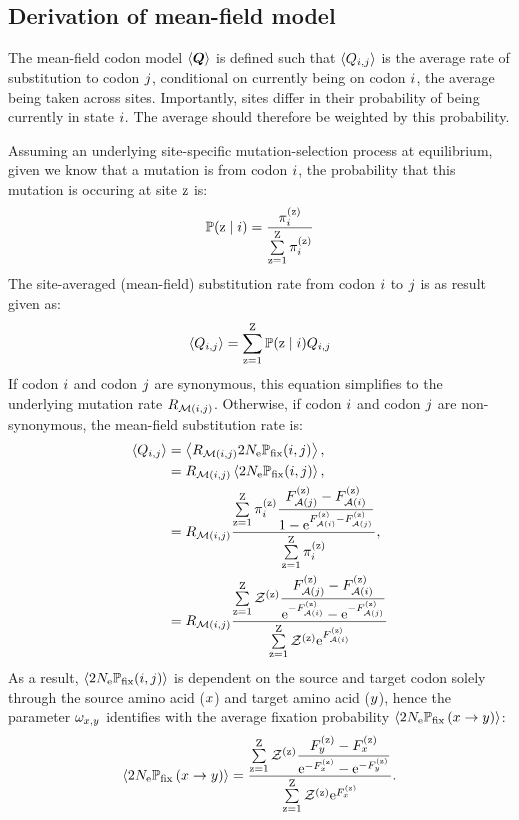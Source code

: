 \documentclass{article}
\begin{document}
\subsection{Derivation of mean-field model}
\label{subsec:mean-field-derivation}
The mean-field codon model $\left\langle \bm{Q} \right\rangle$ is defined such that $\left\langle Q_{{i}, {j}} \right\rangle$ is the average rate of {substitution} to codon ${j}$, conditional on currently being on codon ${i}$, the average being taken across sites.
Importantly, sites differ in their probability of being currently in state ${i}$.
The average should therefore be weighted by this probability.

Assuming an underlying site-specific mutation-selection process at equilibrium, given we know that a mutation is from codon ${i}$, the probability that this mutation is occuring at site $\text{z}$ is:
\begin{align}
 \mathbb{P} (\text{z} \mid {i}) = \dfrac{ \pi_{{i}}^{(\text{z})} }{\sum\limits_{\text{z}=1}^{\text{Z}} \pi_{{i}}^{(\text{z})} }
\end{align}
The site-averaged (mean-field) {substitution} rate from codon ${i}$ to ${j}$ is as result given as:
\begin{align}
 \left\langle Q_{{i}, {j}} \right\rangle = \sum\limits_{\text{z}=1}^{\text{Z}} \mathbb{P} (\text{z} \mid {i}) Q_{{i}, {j}}
\end{align}
If codon ${i}$ and codon ${j}$ are {synonymous}, this equation simplifies to the underlying mutation rate $R_{\mathcal{M}({i}, {j})}$.
Otherwise, if codon ${i}$ and codon ${j}$ are {non-synonymous}, the mean-field {substitution} rate is:
\begin{align}
 \left\langle Q_{{i}, {j}} \right\rangle & = \left\langle R_{\mathcal{M}({i}, {j})} 2 N_{\text{e}} \mathbb{P}_{\text{fix}} ({i}, {j}) \right\rangle, \\
 & = R_{\mathcal{M}({i}, {j})} \left\langle 2 N_{\text{e}} \mathbb{P}_{\text{fix}} ({i}, {j}) \right\rangle, \\
 & = R_{\mathcal{M}({i}, {j})} \dfrac{ \sum\limits_{\text{z}=1}^{\text{Z}} \pi_{{i}}^{(\text{z})} \dfrac{F_{\mathcal{A}({j})}^{(\text{z})} - F_{\mathcal{A}({i})}^{(\text{z})}}{1 - \text{e}^{F_{\mathcal{A}({i})}^{(\text{z})} - F_{\mathcal{A}({j})}^{(\text{z})}}} }{ \sum\limits_{\text{z}=1}^{\text{Z}} \pi_{{i}}^{(\text{z})} }, \\
 & = R_{\mathcal{M}({i}, {j})} \dfrac{ \sum\limits_{\text{z}=1}^{\text{Z}} \mathcal{Z}^{(\text{z})} \dfrac{F_{\mathcal{A}({j})}^{(\text{z})} - F_{\mathcal{A}({i})}^{(\text{z})}}{ \text{e}^{-F_{\mathcal{A}({i})}^{(\text{z})}} - \text{e}^{ - F_{\mathcal{A}({j})}^{(\text{z})}}} }{ \sum\limits_{\text{z}=1}^{\text{Z}} \mathcal{Z}^{(\text{z})} \text{e}^{F_{\mathcal{A}({i})}^{(\text{z})}} }
\end{align}
As a result, $\left\langle 2 N_{\text{e}} \mathbb{P}_{\text{fix}} ({i}, {j}) \right\rangle$ is dependent on the source and target codon solely through the source amino acid ($x$) and target amino acid ($y$), hence the parameter $\omega_{x, y}$ identifies with the average fixation probability $\left\langle 2 N_{\text{e}} \mathbb{P}_{\text{fix}} \left( x \to y \right) \right\rangle$:
\begin{equation}
 \label{eq:omega_pairs_predicted} \left\langle 2 N_{\text{e}} \mathbb{P}_{\text{fix}} \left( x \to y \right) \right\rangle = \dfrac{ \sum\limits_{\text{z}=1}^{\text{Z}} \mathcal{Z}^{(\text{z})} \dfrac{F_{y}^{(\text{z})} - F_{x}^{(\text{z})}}{ \text{e}^{-F_{x}^{(\text{z})}} - \text{e}^{ - F_{y}^{(\text{z})}}} }{ \sum\limits_{\text{z}=1}^{\text{Z}} \mathcal{Z}^{(\text{z})} \text{e}^{F_{x}^{(\text{z})}} }.
\end{equation}
\end{document}
